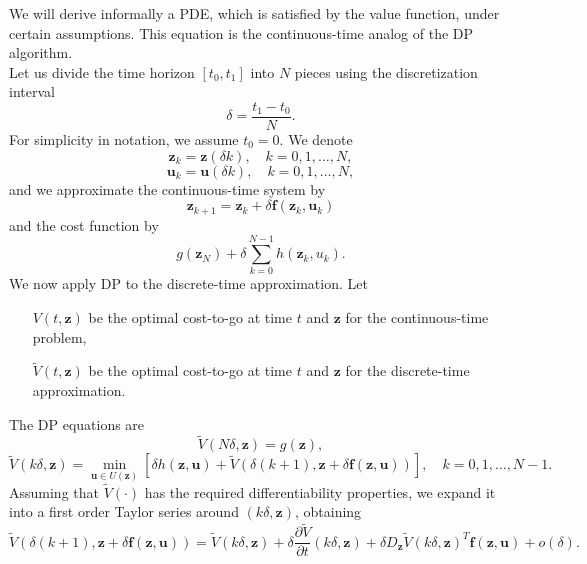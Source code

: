 We will derive informally a PDE, which is satisfied by the value function, 
under certain assumptions. This equation is the continuous-time analog of the DP algorithm.\\

Let us divide the time horizon $[t_0,t_1]$ into $N$ pieces using the discretization interval
\begin{equation*}
\delta=\frac{t_1-t_0}{N}.
\end{equation*}
For simplicity in notation, we assume $t_0=0$. We denote
\begin{equation*}
\bm{z}_k=\bm{z}(\delta k),\quad k=0,1,\dots,N,
\end{equation*}
\begin{equation*}
\bm{u}_k=\bm{u}(\delta k),\quad k=0,1,\dots,N,
\end{equation*}
and we approximate the continuous-time system by
\begin{equation*}
\bm{z}_{k+1}=\bm{z}_k+\delta\bm{f}(\bm{z}_k,\bm{u}_k)
\end{equation*}
and the cost function by
\begin{equation*}
g(\bm{z}_N) + \delta\sum_{k=0}^{N-1}h(\bm{z}_k,u_k).
\end{equation*}
We now apply DP to the discrete-time approximation. Let
\begin{enumerate}

\item[$V(t,\bm{z})$] be the optimal cost-to-go at time $t$ and $\bm{z}$ for the continuous-time problem,

\item[$\tilde{V}(t,\bm{z})$] be the optimal cost-to-go at time $t$ and 
$\bm{z}$ for the discrete-time approximation.

\end{enumerate}
The DP equations are
\begin{equation*}
\tilde{V}(N\delta,\bm{z}) = g(\bm{z}),
\end{equation*}
\begin{equation*}
\tilde{V}(k\delta,\bm{z}) = \min_{\bm{u}\in U(\bm{z})}\left[\delta h(\bm{z},\bm{u})+\tilde{V}\left(\delta(k+1),\bm{z}+\delta \bm{f}(\bm{z},\bm{u})\right)\right],\quad k=0,1,\dots,N-1.
\end{equation*}
Assuming that $\tilde{V}(\cdot)$ has the required differentiability properties, 
we expand it into a first order Taylor series around $(k\delta,\bm{z})$, obtaining
\begin{equation}
\tilde{V}(\delta(k+1),\bm{z}+\delta\bm{f}(\bm{z},\bm{u}))=\tilde{V}(k\delta,\bm{z})+\delta\frac{\partial\tilde{V}}{\partial t}(k\delta,\bm{z})+\delta D_{\bm{z}}\tilde{V}(k\delta,\bm{z})^T\bm{f}(\bm{z},\bm{u})+o(\delta).
\end{equation}
